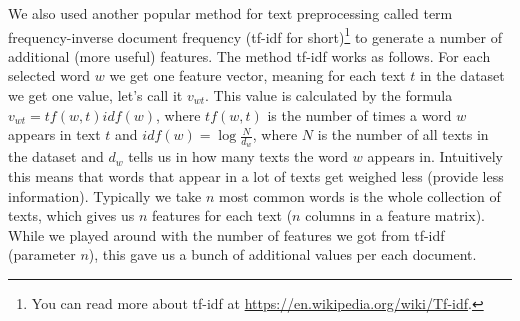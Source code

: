 We also used another popular method for text preprocessing called term
frequency-inverse document frequency (tf-idf for short)\footnote{You can read
more about tf-idf at \url{https://en.wikipedia.org/wiki/Tf-idf}.} to generate a
number of additional (more useful) features. The method tf-idf works as
follows. For each selected word $w$  we get one feature vector, meaning for
each text $t$ in the dataset we get one value, let's call it $v_{wt}$.  This
value is calculated by the formula $v_{wt} = tf(w, t)idf(w)$, where $tf(w, t)$
is the number of times a word $w$ appears in text $t$ and $idf(w) =
\log\frac{N}{d_{w}}$, where $N$ is the number of all texts in the dataset and
$d_{w}$ tells us in how many texts the word $w$ appears in. Intuitively this
means that words that appear in a lot of texts get weighed less (provide less
information). Typically we take $n$ most common words is the whole collection of
texts, which gives us $n$ features for each text ($n$ columns in a feature
matrix). While we played around with the number of features we got from tf-idf
(parameter $n$), this gave us a bunch of additional values per each document.
